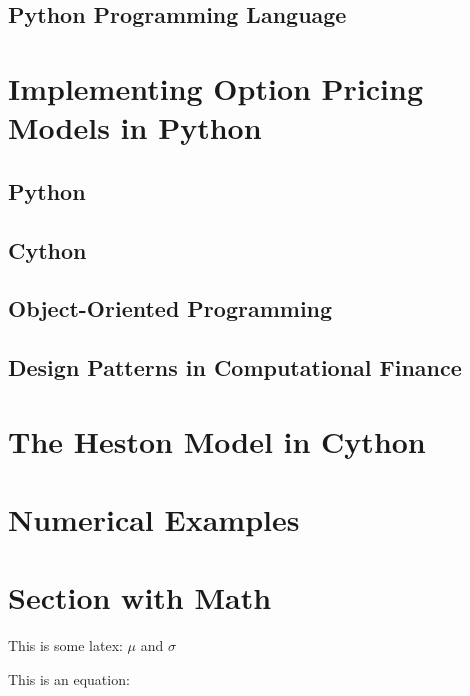\documentclass[11pt,]{article}
\begin{document}
\subsection{Python Programming
Language}\label{python-programming-language}

\section{Implementing Option Pricing Models in
Python}\label{implementing-option-pricing-models-in-python}

\subsection{Python}\label{python}

\subsection{Cython}\label{cython}

\subsection{Object-Oriented
Programming}\label{object-oriented-programming}

\subsection{Design Patterns in Computational
Finance}\label{design-patterns-in-computational-finance}

\section{The Heston Model in Cython}\label{the-heston-model-in-cython}

\section{Numerical Examples}\label{numerical-examples}

\section{Section with Math}\label{section-with-math}

This is some latex: \(\mu\) and \(\sigma\)

This is an equation:

\newpage
\singlespacing 

\end{document}
